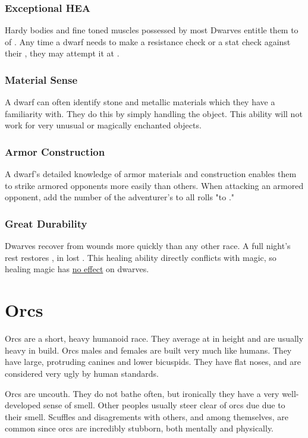 \begin{multicols*}{2}
\subsubsection{Exceptional HEA}
Hardy bodies and fine toned muscles possessed by most Dwarves entitle them to  of . Any time a dwarf needs to make a resistance check or a stat check against their \HEA, they may attempt it at .
\subsubsection{Material Sense}
A dwarf can often identify stone and metallic materials which they have a familiarity with. They do this by simply handling the object. This ability will not work for very unusual or magically enchanted objects.
\subsubsection{Armor Construction}
A dwarf's detailed knowledge of armor materials and construction enables them to strike armored opponents more easily than others. When attacking an armored opponent, add the number of the adventurer's  to all rolls "to ."
\subsubsection{Great Durability}
Dwarves recover from wounds more quickly than any other race. A full night's rest restores , in lost \DP. This healing ability directly conflicts with magic, so healing magic has \ul{no effect} on dwarves.
\makeline
\section{Orcs}
Orcs are a short, heavy humanoid race. They average at  in height and are usually heavy in build. Orcs males and females are built very much like humans. They have large, protruding canines and lower bicuspids. They have flat noses, and are considered very ugly by human standards.

Orcs are uncouth. They do not bathe often, but ironically they have a very well-developed sense of smell. Other peoples usually steer clear of orcs due due to their smell. Scuffles and disagrements with others, and among themselves, are common since orcs are incredibly stubborn, both mentally and physically.


\end{multicols*}
